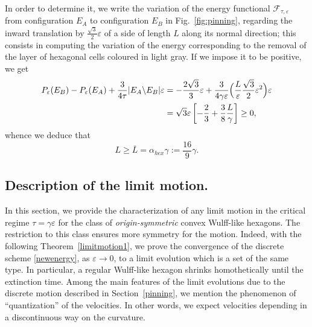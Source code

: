 \documentclass{interact}
\numberwithin{equation}{section}
\theoremstyle{definition}
\renewcommand{\epsilon}{\varepsilon}
\begin{document}
In order to determine it, we write the variation of the energy functional $\mathcal{F}_{\tau,\epsilon}$ from configuration $E_A$ to configuration $E_B$ in Fig.~\ref{fig:pinning}, regarding the inward translation by $\frac{\sqrt{3}}{2}\epsilon$ of a side of length $L$ along its normal direction; this consists in computing the variation of the energy corresponding to the removal of the layer of hexagonal cells coloured in light gray. If we impose it to be positive, we get
\begin{equation*}
\begin{split}
P_\epsilon(E_B)-P_\epsilon(E_A)+\frac{{3}}{4\tau}|E_A\backslash E_B|\epsilon&=-\frac{2\sqrt{3}}{3}\epsilon+\frac{{3}}{4\gamma\epsilon}\Bigl(\frac{L}{\epsilon}\frac{\sqrt 3}{2}\epsilon^2\Bigr)\epsilon\\
&=\sqrt{3}\epsilon\left[-\frac{2}{3}+\frac{{3}}{8}\frac{L}{\gamma}\right]\geq0,
\end{split}
\end{equation*}
whence we deduce that
\begin{equation}
L\geq\overline{L}=\alpha_{hex}\gamma:=\frac{16}{9}\gamma.
\label{threshold}
\end{equation}



\subsection{Description of the limit motion.}\label{limitmotion}

In this section, we provide the characterization of any limit motion in the critical regime $\tau=\gamma\epsilon$ for the class of \emph{origin-symmetric} convex Wulff-like hexagons. The restriction to this class ensures more symmetry for the motion. Indeed, with the following Theorem~\ref{limitmotion1}, we prove the convergence of the discrete scheme \eqref{newenergy}, as $\varepsilon\to0$, to a limit evolution which is a set of the same type. In particular, a regular Wulff-like hexagon shrinks homothetically until the extinction time. Among the main features of the limit evolutions due to the discrete motion described in Section~\ref{pinning}, we mention the phenomenon of ``quantization'' of the velocities. In other words, we expect velocities depending in a discontinuous way on the curvature. 
\end{document}
